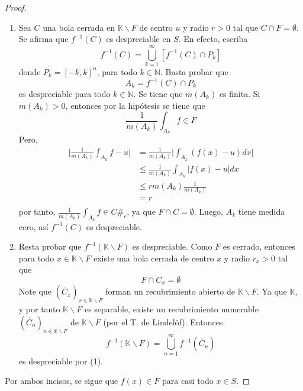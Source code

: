 \documentclass[12pt]{report}
\newcounter{it}
\theoremstyle{largebreak}
\newcommand\contradiction{\ensuremath{\#_c}}
\newcommand\abs[1]{\ensuremath{\big|#1\big|}}
\begin{document}
    \begin{proof}
        \begin{enumerate}
            \item Sea $C$ una bola cerrada en $\mathbb{K}\backslash F$ de centro $u$ y radio $r>0$ tal que $C\cap F=\emptyset$. Se afirma que $f^{-1}(C)$ es despreciable en $S$. En efecto, escriba
            \begin{equation*}
                f^{-1}(C)=\bigcup_{ k=1}^\infty\left[f^{-1}(C)\cap P_k \right]
            \end{equation*}
            donde $P_k=\left[-k,k\right]^n$, para todo $k\in\mathbb{N}$. Basta probar que
            \begin{equation*}
                A_k=f^{-1}(C)\cap P_k
            \end{equation*}
            es despreciable para todo $k\in\mathbb{N}$. Se tiene que $m(A_k)$ es finita. Si $m(A_k)>0$, entonces por la hipótesis se tiene que
            \begin{equation*}
                \frac{1}{m(A_k)}\int_{A_k}f\in F
            \end{equation*}
            Pero,
            \begin{equation*}
                \begin{split}
                    \abs{\frac{1}{m(A_k)}\int_{A_k}f-u}&=\frac{1}{m(A_k)}\abs{\int_{A_k}(f(x)-u)dx}\\
                    &\leq \frac{1}{m(A_k)}\int_{A_k}\abs{f(x)-u}dx\\
                    &\leq r m(A_k)\frac{1}{m(A_k)}\\
                    &=r\\
                \end{split}
            \end{equation*}
            por tanto, $\frac{1}{m(A_k)}\int_{A_k}f\in C$\contradiction, ya que $F\cap C=\emptyset$. Luego, $A_k$ tiene medida cero, así $f^{-1}(C)$ es despreciable.

            \item Resta probar que $f^{-1}(\mathbb{K}\backslash F)$ es despreciable. Como $F$ es cerrado, entonces para todo $x\in\mathbb{K}\backslash F$ existe una bola cerrada de centro $x$ y radio $r_x>0$ tal que
            \begin{equation*}
                F\cap C_x=\emptyset
            \end{equation*}
            Note que $\left(\mathring{C_x} \right)_{ x\in\mathbb{K}\backslash F}$ forman un recubrimiento abierto de $\mathbb{K}\backslash F$. Ya que $\mathbb{K}$, y por tanto $\mathbb{K}\backslash F$ es separable, existe un recubrimiento numerable $\left(\mathring{C_n} \right)_{ n\in\mathbb{K}\backslash F}$ de $\mathbb{K}\backslash F$ (por el T. de Lindelöf). Entonces:
            \begin{equation*}
                f^{-1}(\mathbb{K}\backslash F)=\bigcup_{ n=1}^\infty f^{-1}(\mathring{C_n})
            \end{equation*}
            es despreciable por (1).
        \end{enumerate}
        Por ambos incisos, se sigue que $f(x)\in F$ para casi todo $x\in S$.
    \end{proof}
\end{document}
